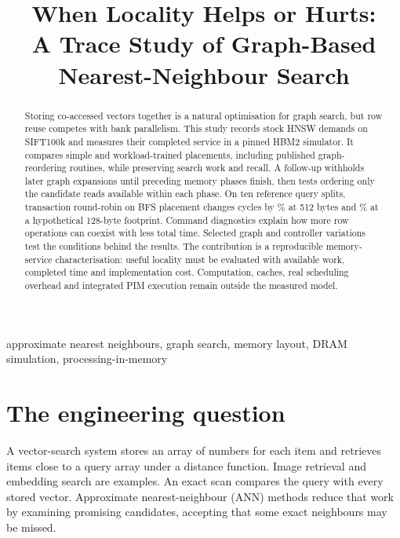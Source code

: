 \documentclass[conference]{IEEEtran}
\begin{document}
\title{When Locality Helps or Hurts:\\A Trace Study of Graph-Based Nearest-Neighbour Search}
\author{}
\maketitle
\begin{abstract}
Storing co-accessed vectors together is a natural optimisation for graph search, but row reuse competes with bank parallelism. This study records stock HNSW demands on SIFT100k and measures their completed service in a pinned HBM2 simulator. It compares simple and workload-trained placements, including published graph-reordering routines, while preserving search work and recall. A follow-up withholds later graph expansions until preceding memory phases finish, then tests ordering only the candidate reads available within each phase. On ten reference query splits, transaction round-robin on BFS placement changes cycles by \RoundRobinBFSMeanFloat\% at 512 bytes and \RoundRobinBFSMeanCompact\% at a hypothetical 128-byte footprint. Command diagnostics explain how more row operations can coexist with less total time. Selected graph and controller variations test the conditions behind the results. The contribution is a reproducible memory-service characterisation: useful locality must be evaluated with available work, completed time and implementation cost. Computation, caches, real scheduling overhead and integrated PIM execution remain outside the measured model.
\end{abstract}
\begin{IEEEkeywords}approximate nearest neighbours, graph search, memory layout, DRAM simulation, processing-in-memory\end{IEEEkeywords}

\section{The engineering question}
A vector-search system stores an array of numbers for each item and retrieves items close to a query array under a distance function. Image retrieval and embedding search are examples. An exact scan compares the query with every stored vector. Approximate nearest-neighbour (ANN) methods reduce that work by examining promising candidates, accepting that some exact neighbours may be missed.
\end{document}
